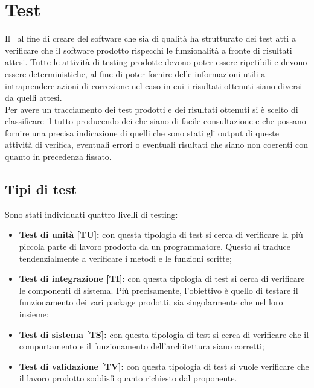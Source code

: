 \section{Test}
Il  \gruppo\ al fine di creare del software che sia di qualità ha strutturato dei test atti a verificare
che il software prodotto rispecchi le funzionalità a fronte di risultati attesi.
Tutte le attività di testing prodotte devono poter essere ripetibili e devono essere deterministiche, al fine di poter
fornire delle informazioni utili a intraprendere azioni di correzione nel caso in cui i risultati ottenuti siano diversi da quelli attesi. \\
Per avere un tracciamento dei test prodotti e dei risultati ottenuti si è scelto di classificare il tutto producendo dei
 che siano di facile consultazione e che possano fornire una precisa indicazione di quelli che sono stati
gli output di queste attività di verifica, eventuali errori o eventuali risultati che siano non coerenti con quanto in precedenza fissato.

\subsection{Tipi di test}
Sono stati individuati quattro livelli di testing:
\begin{itemize}
\item \textbf{Test di unità [TU]:} con questa tipologia di test si cerca di verificare la più piccola parte di lavoro prodotta da un programmatore. Questo si traduce tendenzialmente a verificare i metodi e le funzioni scritte;
\item \textbf{Test di integrazione [TI]:} con questa tipologia di test si cerca di verificare le componenti di sistema. Più precisamente, l'obiettivo è quello di testare il funzionamento dei vari package prodotti, sia singolarmente che nel loro insieme;
\item \textbf{Test di sistema [TS]:} con questa tipologia di test si cerca di verificare che il comportamento e il funzionamento dell'architettura siano corretti;
\item \textbf{Test di validazione [TV]:} con questa tipologia di test si vuole verificare che il lavoro prodotto soddisfi quanto richiesto dal proponente.
\end{itemize}







